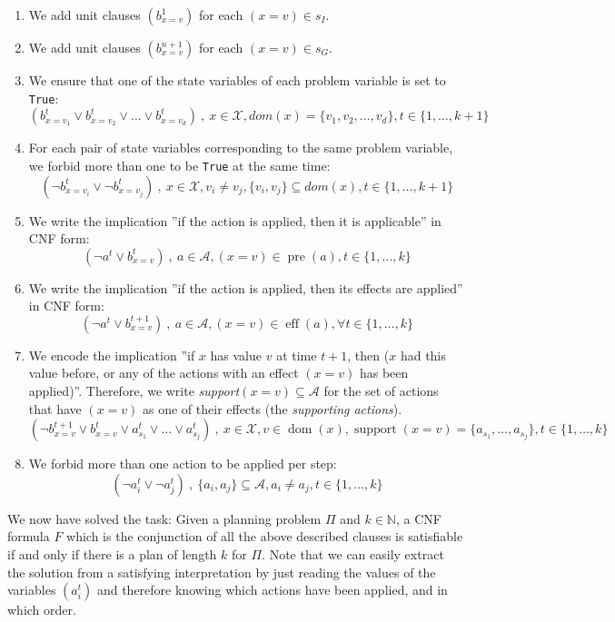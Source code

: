 \documentclass{article}
\theoremstyle{definition}
\begin{document}
\begin{enumerate}
\item We add unit clauses $(b_{x=v}^1)$ for each $(x = v) \in s_I$.
\item We add unit clauses $(b_{x=v}^{n+1})$ for each $(x = v) \in s_G$.
\item We ensure that one of the state variables of each problem variable is set to \texttt{True}: \[(b_{x=v_1}^t \vee b_{x=v_2}^t \vee \dots \vee b_{x=v_d}^t)\ ,\ x \in \mathcal{X}, \textit{dom}(x)=\{v_1, v_2, \dots, v_d\}, t \in \{1,\dots,k+1\}\]
\item For each pair of state variables corresponding to the same problem variable, we forbid more than one to be \texttt{True} at the same time: \[(\neg b_{x=v_i}^t \vee \neg b_{x=v_j}^t)\ ,\ x \in \mathcal{X}, v_i \neq v_j, \{v_i,v_j\} \subseteq \textit{dom}(x), t \in \{1,\dots,k+1\}\]
\item We write the implication ''if the action is applied, then it is applicable'' in CNF form: \[(\neg a^t \vee b_{x=v}^t)\ ,\ a \in \mathcal{A}, (x=v)\in \operatorname{pre}(a), t \in \{1,\dots,k\}\]
\item We write the implication ''if the action is applied, then its effects are applied'' in CNF form: \[(\neg a^t \vee b_{x=v}^{t+1})\ ,\ a \in \mathcal{A}, (x=v)\in \operatorname{eff}(a), \forall t \in \{1,\dots,k\}\]
\item We encode the implication ''if $x$ has value $v$ at time $t+1$, then ($x$ had this value before, or any of the actions with an effect $(x = v)$ has been applied)''. Therefore, we write \textit{support}$(x = v) \subseteq \mathcal{A}$ for the set of actions that have $(x = v)$ as one of their effects (the \emph{supporting actions}). \[(\neg b_{x=v}^{t+1} \vee b_{x=v}^{t} \vee a_{s_1}^t \vee \dots \vee a_{s_j}^t)\ ,\ x \in \mathcal{X}, v \in \operatorname{dom}(x), 
\operatorname{support}(x=v)=\{a_{s_1},\dots,a_{s_j}\}, t \in \{1,\dots,k\}\]
\item We forbid more than one action to be applied per step: \[(\neg a_{i}^t \vee \neg a_{j}^t)\ ,\ \{a_i,a_j\} \subseteq  \mathcal{A}, a_i \neq a_j, t \in \{1,\dots,k\}\]
\end{enumerate}

We now have solved the task: Given a planning problem $\Pi$ and $k \in \mathbb{N}$, a CNF formula $F$ which is the conjunction of all the above described clauses is satisfiable if and only if there is a plan of length $k$ for $\Pi$. Note that we can easily extract the solution from a satisfying interpretation by just reading the values of the variables $(a_i^t)$ and therefore knowing which actions have been applied, and in which order.
\end{document}
